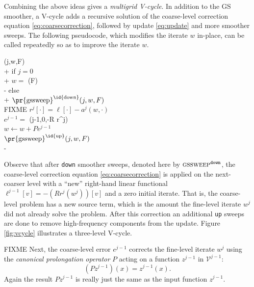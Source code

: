\documentclass[letterpaper,final,12pt,reqno]{amsart}
\theoremstyle{claim}
\numberwithin{equation}{section}
\numberwithin{figure}{section}
\numberwithin{table}{section}
\begin{document}
Combining the above ideas gives a \emph{multigrid V-cycle}.  In addition to the GS smoother, a V-cycle adds a recursive solution of the coarse-level correction equation \eqref{eq:coarsecorrection}, followed by update \eqref{eq:update} and more smoother sweeps.  The following pseudocode, which modifies the iterate $w$ in-place, can be called repeatedly so as to improve the iterate $w$.
\begin{pseudo*}
(j,w,F)\text{:} \\+
    if $j=0$ \\+
        $w =$ (F) \\-
    else \\+
        $\text{\pr{gssweep}}^{\text{\id{down}}}(j,w,F)$ \\
        FIXME $r^j[\cdot] = \ell[\cdot] - a^j(w,\cdot)$ \\
        $e^{j-1} =$ (j-1,0,-R r^j) \\
        $w \gets w + P e^{j-1}$ \\
        $\text{\pr{gssweep}}^{\text{\id{up}}}(j,w,F)$ \\-
\end{pseudo*}

Observe that after \texttt{down} smoother sweeps, denoted here by $\text{\textsc{gssweep}}^{\text{\texttt{down}}}$, the coarse-level correction equation \eqref{eq:coarsecorrection} is applied on the next-coarser level with a ``new'' right-hand linear functional $\ell^{j-1}[v]=-(R r^j(w^j))[v]$ and a zero initial iterate.  That is, the coarse-level problem has a new source term, which is the amount the fine-level iterate $w^j$ did not already solve the problem.  After this correction an additional \texttt{up} sweeps are done to remove high-frequency components from the update.  Figure \ref{fig:vcycle} illustrates a three-level V-cycle.

FIXME Next, the coarse-level error $e^{j-1}$ corrects the fine-level iterate $w^j$ using the \emph{canonical prolongation operator} $P$ acting on a function $z^{j-1}$ in $\mathcal{V}^{j-1}$:
\begin{equation}
  (P z^{j-1})(x) = z^{j-1}(x). \label{eq:canonicalprolongation}
\end{equation}
Again the result $P z^{j-1}$ is really just the same as the input function $z^{j-1}$.
\end{document}
